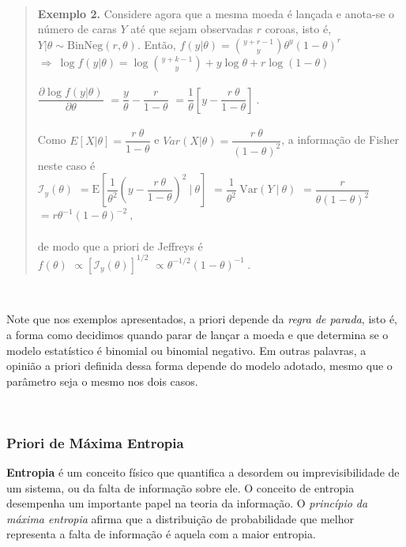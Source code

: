 \documentclass[
]{book}
\begin{document}
\(~\)

\begin{quote}
\textbf{Exemplo 2.} Considere agora que a mesma moeda é lançada e anota-se o número de caras \(Y\) até que sejam observadas \(r\) coroas, isto é, \(Y|\theta \sim \text{BinNeg}(r,\theta)\). Então,
\(f(y|\theta)=\displaystyle\binom{y+r-1}{y}\theta^y(1-\theta)^{r}\)
\(\Longrightarrow~ \log f(y|\theta)=\log\binom{y+k-1}{y}+y\log\theta+r\log(1-\theta)\)\\
\(~\)\\
\(\dfrac{\partial\log f(y|\theta)}{\partial\theta}\)
\(=\dfrac{y}{\theta}-\dfrac{r}{1-\theta}\)
\(=\dfrac{1}{\theta}\left[y-\dfrac{r~\theta}{1-\theta}\right]~.\)\\
\(~\)\\
Como \(E\left[X|\theta\right]=\dfrac{r~\theta}{1-\theta}\) e \(Var(X|\theta)=\dfrac{r~\theta}{(1-\theta)^2}\), a informação de Fisher neste caso é\\
\(\mathcal{I}_y(\theta)\) \(=\text{E}\left[\dfrac{1}{\theta^2}\left(y-\dfrac{r~\theta}{1-\theta}\right)^2~\bigg|~\theta\right]\)
\(=\dfrac{1}{\theta^2}~\text{Var}\left(Y~|~\theta\right)\)
\(=\dfrac{r}{\theta(1-\theta)^2}\) \(=r\theta^{-1}(1-\theta)^{-2}~,\)\\
\(~\)\\
de modo que a priori de Jeffreys é\\
\(f(\theta)\) \(\propto\left[\mathcal{I}_y(\theta)\right]^{1/2}\)
\(\propto\theta^{-1/2}(1-\theta)^{-1}~.\)
\end{quote}

\(~\)

Note que nos exemplos apresentados, a priori depende da \emph{regra de parada}, isto é, a forma como decidimos quando parar de lançar a moeda e que determina se o modelo estatístico é binomial ou binomial negativo. Em outras palavras, a opinião a priori definida dessa forma depende do modelo adotado, mesmo que o parâmetro seja o mesmo nos dois casos.

\(~\)

\hypertarget{priori-de-muxe1xima-entropia}{%
\subsubsection{Priori de Máxima Entropia}\label{priori-de-muxe1xima-entropia}}

\textbf{Entropia} é um conceito físico que quantifica a desordem ou imprevisibilidade de um sistema, ou da falta de informação sobre ele. O conceito de entropia desempenha um importante papel na teoria da informação. O \emph{princípio da máxima entropia} afirma que a distribuição de probabilidade que melhor representa a falta de informação é aquela com a maior entropia.
\end{document}
